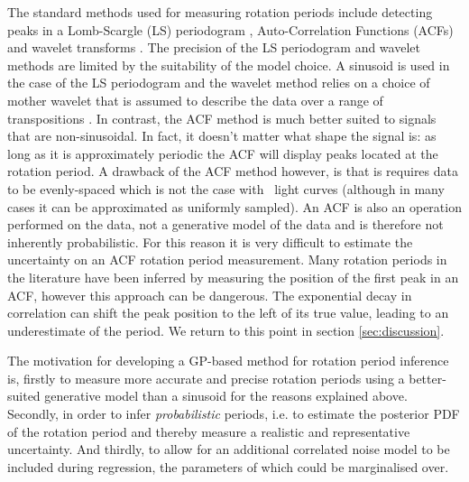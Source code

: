 The standard methods used for measuring rotation periods include detecting
peaks in a Lomb-Scargle \citep{Lomb1976, Scargle1982} (LS) periodogram
\citep[e.g.][]{Reinhold2013}, Auto-Correlation Functions (ACFs)
\citep{Mcquillan2013} and wavelet transforms \citep{Garcia2014}.
The precision of the LS periodogram and wavelet methods are limited by the
suitability of the model choice.
A sinusoid is used in the case of the LS periodogram and the wavelet method
relies on a choice of mother wavelet that is assumed to describe the data over
a range of transpositions \citep[see, \eg][]{Carter2010}.
In contrast, the ACF method is much better suited to signals that are
non-sinusoidal.
In fact, it doesn't matter what shape the signal is: as long as it is
approximately periodic the ACF will display peaks located at the rotation
period.
A drawback of the ACF method however, is that is requires data to be
evenly-spaced which is not the case with \Kepler\ light curves (although in
many cases it can be approximated as uniformly sampled).
An ACF is also an operation performed on the data, not a generative model of
the data and is therefore not inherently probabilistic.
For this reason it is very difficult to estimate the uncertainty on an ACF
rotation period measurement.
Many rotation periods in the literature have been inferred by measuring the
position of the first peak in an ACF, however this approach can be dangerous.
The exponential decay in correlation can shift the peak position to the left
of its true value, leading to an underestimate of the period.
We return to this point in section \textsection \ref{sec:discussion}.

The motivation for developing a GP-based method for rotation period inference
is, firstly to measure more accurate and precise rotation periods using a
better-suited generative model than a sinusoid for the reasons explained
above.
Secondly, in order to infer {\it probabilistic} periods, i.e. to estimate the
posterior PDF of the rotation period and thereby measure a realistic and
representative uncertainty.
And thirdly, to allow for an additional correlated noise model to be included
during regression, the parameters of which could be marginalised over.

